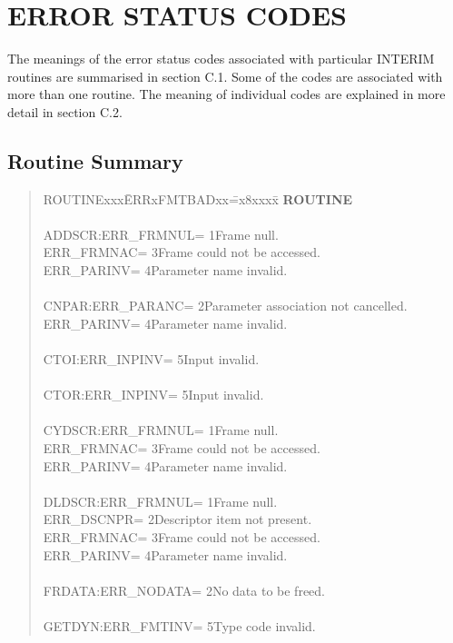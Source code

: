 \section {ERROR STATUS CODES}
The meanings of the error status codes associated with particular INTERIM
routines are summarised in section C.1.
Some of the codes are associated with more than one routine.
The meaning of individual codes are explained in more detail in section C.2.
\subsection {Routine Summary}
\begin{quote}
\begin{tabbing}
ROUTINExxx\=ERRxFMTBADxx\==x8xxxx\=\kill
{\bf ROUTINE}\>\\
\\
ADDSCR:\>ERR\_FRMNUL\>= 1\>Frame null.\\
\>ERR\_FRMNAC\>= 3\>Frame could not be accessed.\\
\>ERR\_PARINV\>= 4\>Parameter name invalid.\\
\\
CNPAR:\>ERR\_PARANC\>= 2\>Parameter association not cancelled.\\
\>ERR\_PARINV\>= 4\>Parameter name invalid.\\
\\
CTOI:\>ERR\_INPINV\>= 5\>Input invalid.\\
\\
CTOR:\>ERR\_INPINV\>= 5\>Input invalid.\\
\\
CYDSCR:\>ERR\_FRMNUL\>= 1\>Frame null.\\
\>ERR\_FRMNAC\>= 3\>Frame could not be accessed.\\
\>ERR\_PARINV\>= 4\>Parameter name invalid.\\
\\
DLDSCR:\>ERR\_FRMNUL\>= 1\>Frame null.\\
\>ERR\_DSCNPR\>= 2\>Descriptor item not present.\\
\>ERR\_FRMNAC\>= 3\>Frame could not be accessed.\\
\>ERR\_PARINV\>= 4\>Parameter name invalid.\\
\\
FRDATA:\>ERR\_NODATA\>= 2\>No data to be freed.\\
\\
GETDYN:\>ERR\_FMTINV\>= 5\>Type code invalid.\\

\end{tabbing}
\end{quote}
